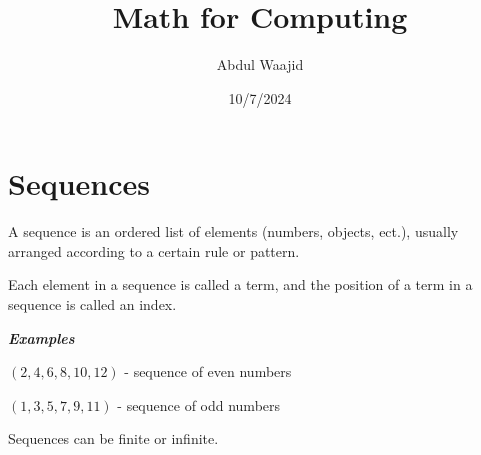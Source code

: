 \documentclass[]{article}
\title{Math for Computing}
\author{Abdul Waajid}
\date{10/7/2024}
\begin{document}
\maketitle

\section{Sequences}

A sequence is an ordered list of elements (numbers, objects, ect.), usually arranged according to a certain rule or pattern.

Each element in a sequence is called a term, and the position of a term in a sequence is called an index.

\textbf{\textit{Examples}}

$(2, 4, 6, 8, 10, 12)$ - sequence of even numbers

$(1, 3, 5, 7, 9, 11)$ - sequence of odd numbers

Sequences can be finite or infinite.
\end{document}
